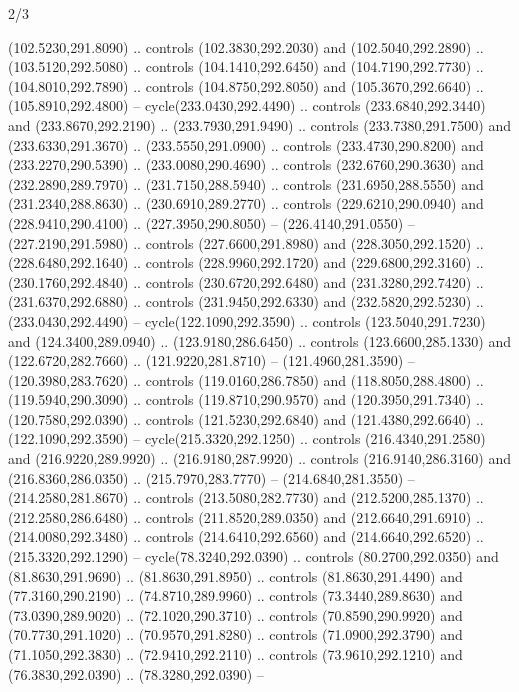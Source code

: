 \begin{flagdescription}{2/3}
\begin{scope}[xshift=0.5\flaglength,yshift=0.5\flagwidth,scale=\stretchfactor]
\begin{scope}[scale=0.001645\flagwidth,yshift=65mm,xshift=-63mm]
\begin{scope}[y=0.80pt, x=0.80pt, yscale=-1,]
\begin{scope}[cm={{1.33333,0.0,0.0,1.33333,(0.0,1e-05)}}]
  (102.5230,291.8090) .. controls (102.3830,292.2030) and (102.5040,292.2890) ..
  (103.5120,292.5080) .. controls (104.1410,292.6450) and (104.7190,292.7730) ..
  (104.8010,292.7890) .. controls (104.8750,292.8050) and (105.3670,292.6640) ..
  (105.8910,292.4800) -- cycle(233.0430,292.4490) .. controls
  (233.6840,292.3440) and (233.8670,292.2190) .. (233.7930,291.9490) .. controls
  (233.7380,291.7500) and (233.6330,291.3670) .. (233.5550,291.0900) .. controls
  (233.4730,290.8200) and (233.2270,290.5390) .. (233.0080,290.4690) .. controls
  (232.6760,290.3630) and (232.2890,289.7970) .. (231.7150,288.5940) .. controls
  (231.6950,288.5550) and (231.2340,288.8630) .. (230.6910,289.2770) .. controls
  (229.6210,290.0940) and (228.9410,290.4100) .. (227.3950,290.8050) --
  (226.4140,291.0550) -- (227.2190,291.5980) .. controls (227.6600,291.8980) and
  (228.3050,292.1520) .. (228.6480,292.1640) .. controls (228.9960,292.1720) and
  (229.6800,292.3160) .. (230.1760,292.4840) .. controls (230.6720,292.6480) and
  (231.3280,292.7420) .. (231.6370,292.6880) .. controls (231.9450,292.6330) and
  (232.5820,292.5230) .. (233.0430,292.4490) -- cycle(122.1090,292.3590) ..
  controls (123.5040,291.7230) and (124.3400,289.0940) .. (123.9180,286.6450) ..
  controls (123.6600,285.1330) and (122.6720,282.7660) .. (121.9220,281.8710) --
  (121.4960,281.3590) -- (120.3980,283.7620) .. controls (119.0160,286.7850) and
  (118.8050,288.4800) .. (119.5940,290.3090) .. controls (119.8710,290.9570) and
  (120.3950,291.7340) .. (120.7580,292.0390) .. controls (121.5230,292.6840) and
  (121.4380,292.6640) .. (122.1090,292.3590) -- cycle(215.3320,292.1250) ..
  controls (216.4340,291.2580) and (216.9220,289.9920) .. (216.9180,287.9920) ..
  controls (216.9140,286.3160) and (216.8360,286.0350) .. (215.7970,283.7770) --
  (214.6840,281.3550) -- (214.2580,281.8670) .. controls (213.5080,282.7730) and
  (212.5200,285.1370) .. (212.2580,286.6480) .. controls (211.8520,289.0350) and
  (212.6640,291.6910) .. (214.0080,292.3480) .. controls (214.6410,292.6560) and
  (214.6640,292.6520) .. (215.3320,292.1290) -- cycle(78.3240,292.0390) ..
  controls (80.2700,292.0350) and (81.8630,291.9690) .. (81.8630,291.8950) ..
  controls (81.8630,291.4490) and (77.3160,290.2190) .. (74.8710,289.9960) ..
  controls (73.3440,289.8630) and (73.0390,289.9020) .. (72.1020,290.3710) ..
  controls (70.8590,290.9920) and (70.7730,291.1020) .. (70.9570,291.8280) ..
  controls (71.0900,292.3790) and (71.1050,292.3830) .. (72.9410,292.2110) ..
  controls (73.9610,292.1210) and (76.3830,292.0390) .. (78.3280,292.0390) --

\end{scope}
\end{scope}
\end{scope}
\end{scope}
\end{flagdescription}
